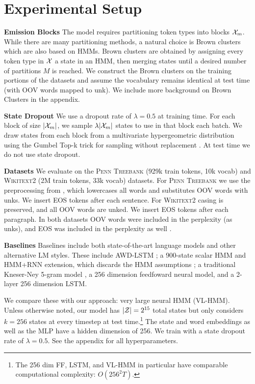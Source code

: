 \documentclass[11pt,a4paper]{article}
\begin{document}
\section{Experimental Setup}
\label{sec:experiments}

\noindent\textbf{Emission Blocks}
The model requires partitioning token types into blocks $\mathcal{X}_m$. 
While there are many partitioning methods, a natural choice
is Brown clusters \citep{brown1992,liang2005brown} which are also based on HMMs.
Brown clusters are obtained by assigning every token type in $\mathcal{X}$ a state in an HMM,
then merging states until a desired number of partitions $M$ is reached.
We construct the Brown clusters on the training portions of the datasets
and assume the vocabulary remains identical at test time (with OOV words mapped to unk).
We include more background on Brown Clusters in the appendix.

\noindent\textbf{State Dropout}
We use a dropout rate of $\lambda = 0.5$ at training time. 
For each block of size $|\mathcal{X}_m|$, we sample $\lambda|\mathcal{X}_m|$ states to use in that block each batch.
We draw states from each block from a multivariate hypergeometric distribution
using the Gumbel Top-k trick for sampling without replacement \citep{vieira2014gumbel}.
At test time we do not use state dropout.

\noindent \textbf{Datasets}
We evaluate on the \textsc{Penn Treebank} \citep{ptb} (929k train tokens, 10k vocab)
and \textsc{Wikitext2} \citep{wikitext} (2M train tokens, 33k vocab) datasets.
For \textsc{Penn Treebank} we use the preprocessing from \citet{mikolov-2011},
which lowercases all words and substitutes OOV words with unks. 
We insert EOS tokens after each sentence.
For \textsc{Wikitext2} casing is preserved, and all OOV words are unked.
We insert EOS tokens after each paragraph.
In both datasets OOV words were included in the perplexity (as unks),
and EOS was included in the perplexity as well \citep{merity2017awdlstm}.

\noindent \textbf{Baselines}
Baselines include both state-of-the-art language models 
and other alternative LM styles. 
These include AWD-LSTM \citep{merity2017awdlstm};
a 900-state scalar HMM and HMM+RNN extension,
which discards the HMM assumptions \citep{buys2018hmm};
a traditional Kneser-Ney 5-gram model \citep{mikolov2012rnn,kenlm},
a 256 dimension feedfoward neural model,
and a 2-layer 256 dimension LSTM.

We compare these with our approach: very large neural HMM (VL-HMM).
Unless otherwise noted, our model has $|\mathcal{Z}|=2^{15}$ total states 
but only considers $k=256$ states at every timestep at
test time.\footnote{
The 256 dim FF, LSTM, and VL-HMM in particular
have comparable computational complexity: $O(256^2 T)$.
}
The state and word embeddings as well as the MLP have a hidden dimension of 256.
We train with a state dropout rate of $\lambda=0.5$.
See the appendix for all hyperparameters.
\end{document}
